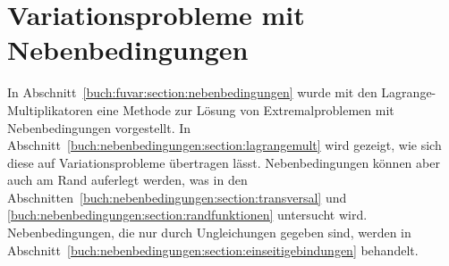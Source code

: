 %
%
%
\chapter{Variationsprobleme mit Nebenbedingungen
\label{buch:chapter:nebenbedingungen}}
In Abschnitt~\ref{buch:fuvar:section:nebenbedingungen} wurde mit den
Lagrange-Multiplikatoren eine Methode zur Lösung von Extremalproblemen
mit Nebenbedingungen vorgestellt.
In Abschnitt~\ref{buch:nebenbedingungen:section:lagrangemult} wird
gezeigt, wie sich diese auf Variationsprobleme übertragen lässt.
Nebenbedingungen können aber auch am Rand auferlegt werden, was
in den Abschnitten~\ref{buch:nebenbedingungen:section:transversal}
und \ref{buch:nebenbedingungen:section:randfunktionen}
untersucht wird.
Nebenbedingungen, die nur durch Ungleichungen gegeben sind,
werden in
Abschnitt~\ref{buch:nebenbedingungen:section:einseitigebindungen}
behandelt.






\uebungsabschnitt

\begin{uebungsaufgaben}
\end{uebungsaufgaben}
\enduebungsabschnitt


